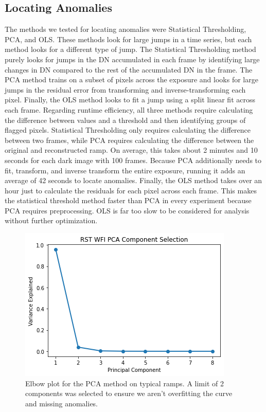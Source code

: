 \subsection{Locating Anomalies}
The methods we tested for locating anomalies were Statistical Thresholding, PCA, and OLS.
These methods look for large jumps in a time series, but each method looks for a different type of jump.
The Statistical Thresholding method purely looks for jumps in the DN accumulated in each frame by identifying large changes in DN compared to the rest of the accumulated DN in the frame. 
The PCA method trains on a subset of pixels across the exposure and looks for large jumps in the residual error from transforming and inverse-transforming each pixel. 
Finally, the OLS method looks to fit a jump using a split linear fit across each frame.
Regarding runtime efficiency, all three methods require calculating the difference between values and a threshold and then identifying groups of flagged pixels. 
Statistical Thresholding only requires calculating the difference between two frames, while PCA requires calculating the difference between the original and reconstructed ramp.
On average, this takes about 2 minutes and 10 seconds for each dark image with 100 frames. 
Because PCA additionally needs to fit, transform, and inverse transform the entire exposure, running it adds an average of 42 seconds to locate anomalies. 
Finally, the OLS method takes over an hour just to calculate the residuals for each pixel across each frame.
This makes the statistical threshold method faster than PCA in every experiment because PCA requires preprocessing. 
OLS is far too slow to be considered for analysis without further optimization.

\begin{figure}
    \centering
    \includegraphics[width=.5\linewidth]{figs/rst/elbow.png}
    \caption[Elbow Plot of PCA for Typical Ramps in WFI Detector Data]{Elbow plot for the PCA method on typical ramps. A limit of 2 components was selected to ensure we aren't overfitting the curve and missing anomalies.}
    \label{rst/fig:elbow}
\end{figure}


